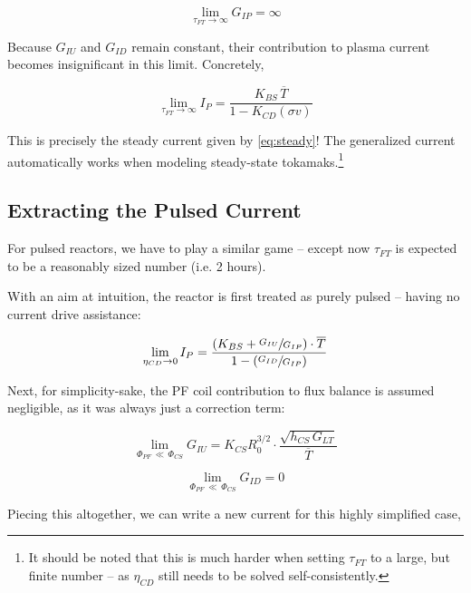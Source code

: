 \begin{equation}
	\lim_{\tau_{FT} \to \infty} G_{IP} = \infty
\end{equation}

Because $G_{IU}$ and $G_{ID}$ remain constant, their contribution to plasma current becomes insignificant in this limit. Concretely,

\begin{equation}
	\label{eq:tau_inf}
	\lim_{\tau_{FT} \to \infty} I_P = \frac{ K_{BS} \, \overline T }{ 1 - K_{CD} ( \sigma v ) }
\end{equation}

This is precisely the steady current given by \cref{eq:steady}! The generalized current automatically works when modeling steady-state tokamaks.\footnote{ It should be noted that this is much harder when setting $\tau_{FT}$ to a large, but finite number -- as $\eta_{CD}$ still needs to be solved self-consistently. }

\subsection{Extracting the Pulsed Current}

For pulsed reactors, we have to play a similar game -- except now $\tau_{FT}$ is expected to be a reasonably sized number (i.e. 2 hours).

With an aim at intuition, the reactor is first treated as purely pulsed -- having no current drive assistance:

\begin{equation}
	\lim_{\eta_{CD} \to 0} I_P = \frac{ \left( K_{BS} + \sfrac{ G_{IU} }{ G_{IP} } \right) \cdot \overline T }{ 1 - \left( \sfrac{ G_{ID} }{ G_{IP} } \right) }
\end{equation}

Next, for simplicity-sake, the PF coil contribution to flux balance is assumed negligible, as it was always just a correction term:

\begin{equation}
	\lim_{ \Phi_{PF} \, \ll \, \Phi_{CS} } G_{IU} = K_{CS} R_0^{3/2} \cdot \frac{ \sqrt{ h_{CS} \, G_{LT} } }{ \overline T }
\end{equation}

\begin{equation}
	\lim_{ \Phi_{PF} \, \ll \, \Phi_{CS} } G_{ID} = 0
\end{equation}

Piecing this altogether, we can write a new current for this highly simplified case, 

